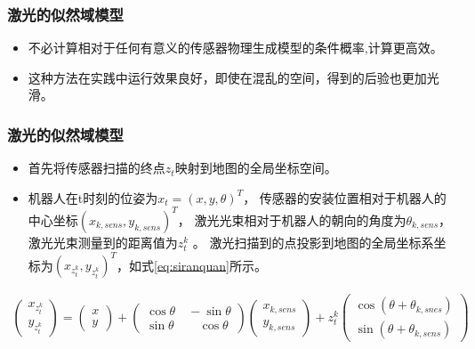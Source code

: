 \begin{frame}
  \frametitle{激光的似然域模型}
  \begin{itemize}
    \item 不必计算相对于任何有意义的传感器物理生成模型的条件概率,计算更高效。
    \item 这种方法在实践中运行效果良好，即使在混乱的空间，得到的后验也更加光滑。
  \end{itemize}
\end{frame}

\begin{frame}
  \frametitle{激光的似然域模型}
  \begin{itemize}
    \item 首先将传感器扫描的终点$z_t$映射到地图的全局坐标空间。
    \item 机器人在t时刻的位姿为$x_t = (x,y, \theta)^T$，
          传感器的安装位置相对于机器人的中心坐标$(x_{k, sens}, y_{k, sens})^T$，
          激光光束相对于机器人的朝向的角度为$\theta_{k, sens}$，
          激光光束测量到的距离值为$z_t^k$ 。
          激光扫描到的点投影到地图的全局坐标系坐标为$(x_{z_t^k}, y_{z_t^k})^T$，如式\ref{eq:siranquan}所示。
  \end{itemize}

  \begin{eqnarray}
    \begin{pmatrix}
      x_{z_t^k} \\ y_{z_t^k}
    \end{pmatrix}
    = 
    \begin{pmatrix}
      x \\ y
    \end{pmatrix}
    +
    \begin{pmatrix}
      \cos\theta \quad -\sin\theta \\
      \sin \theta \qquad \cos\theta
    \end{pmatrix}
    \begin{pmatrix}
      x_{k, sens} \\ y_{k, sens}
    \end{pmatrix}
    +
    z_t^k
    \begin{pmatrix}
      \cos(\theta + \theta_{k, snes}) \\ \sin(\theta + \theta_{k, sens})
    \end{pmatrix}
    \label{eq:siranquan}
  \end{eqnarray}
\end{frame}

